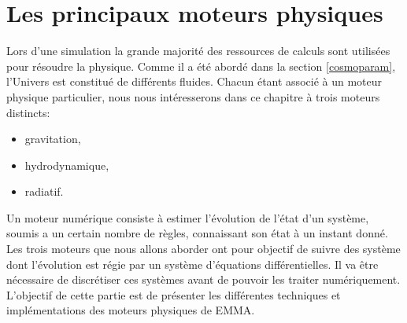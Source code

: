 \chapter{Les principaux moteurs physiques}
\label{sec:solvers}


Lors d'une simulation la grande majorité des ressources de calculs sont utilisées pour résoudre la physique.
Comme il a été abordé dans la section \ref{cosmoparam}, l'Univers est constitué de différents fluides.
Chacun étant associé à un moteur physique particulier, nous nous intéresserons dans ce chapitre à trois moteurs distincts:
\begin{itemize}
\item gravitation,
\item hydrodynamique,
\item radiatif.
\end{itemize}



Un moteur numérique consiste à estimer l'évolution de l'état d'un système, soumis a un certain nombre de règles, connaissant son état à un instant donné.
Les trois moteurs que nous allons aborder ont pour objectif de suivre des système dont l'évolution est régie par un système d'équations différentielles.
Il va être nécessaire de discrétiser ces systèmes avant de pouvoir les traiter numériquement.
L'objectif de cette partie est de présenter les différentes techniques et implémentations des moteurs physiques de EMMA.


